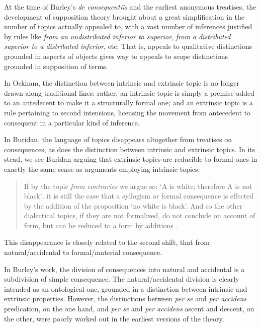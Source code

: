 At the time of Burley's \textit{de consequentiis} and the earliest anonymous treatises, the development of supposition theory brought about a great simplification in the number of topics actually appealed to, with a vast number of inferences justified by rules like \textit{from an undistributed inferior to superior}, \textit{from a distributed superior to a distributed inferior}, etc. That is, appeals to qualitative distinctions grounded in aspects of objects gives way to appeals to scope distinctions grounded in supposition of terms.

In Ockham, the distinction between intrinsic and extrinsic topic is no longer drawn along traditional lines: rather, an intrinsic topic is simply a premise added to an antedecent to make it a structurally formal one; and an extrinsic topic is a rule pertaining to second intensions, licensing the movement from antecedent to consequent in a particular kind of inference. 

In Buridan, the language of topics disappears altogether from treatises on consequences, as does the distinction between intrinsic and extrinsic topics. In its stead, we see Buridan arguing that extrinsic topics are reducible to formal ones in exactly the same sense as arguments employing intrinsic topics: 
\begin{quote}
If by the topic \textit{from contraries} we argue so: `A is white; therefore A is not black', it is still the case that a syllogism or formal consequence is effected by the addition of the proposition `no white is black'. And so the other dialectical topics, if they are not formalized, do not conclude on account of form, but can be reduced to a form by additions \cite[sec. 6.6]{BuridanLoci}.
\end{quote}

This disappearance is closely related to the second shift, that from natural/accidental to formal/material consequence. 

In Burley's work, the division of consequences into natural and accidental is a subdivision of simple consequence. The natural/accidental division is clearly intended as an ontological one, grounded in a distinction between intrinsic and extrinsic properties. However, the distinctions between \textit{per se} and \textit{per accidens} predication, on the one hand, and \textit{per se} and \textit{per accidens} ascent and descent, on the other, were poorly worked out in the earliest versions of the theory. 

